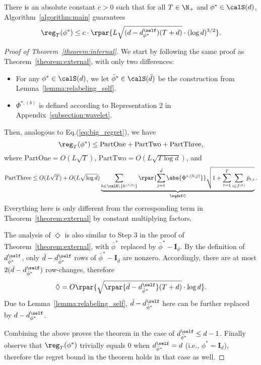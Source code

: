 \documentclass[10pt]{article}
\begin{document}
\begin{theorem}\label{theorem:internal}
There is an absolute constant $c>0$ such that for all $T\in\N_+$ and $\phi^*\in\calS(d)$, Algorithm~\ref{algorithm:main} guarantees
\begin{equation*}
\reg_T(\phi^*)\leq c\cdot\rpar{L\sqrt{(d-d^\self_{\phi^*})(T+d)}\cdot(\log d)^{3/2}}.
\end{equation*}
\end{theorem}

\begin{proof}[Proof of Theorem~\ref{theorem:internal}]
We start by following the same proof as Theorem~\ref{theorem:external}, with only two differences: 
\begin{itemize}
\item For any $\phi^*\in\calS(d)$, we let $\bar\phi^*\in\calS(\bar d)$ be the construction from Lemma~\ref{lemma:relabeling_self}.
\item $\Phi^{*,(b)}$ is defined according to Representation 2 in Appendix~\ref{subsection:wavelet}. 
\end{itemize}
Then, analogous to Eq.(\ref{eq:big_regret}), we have
\begin{equation*}
\reg_T(\phi^*)\leq \mathrm{PartOne}+\mathrm{PartTwo}+\mathrm{PartThree},
\end{equation*}
where $\mathrm{PartOne}=O(L\sqrt{T})$, $\mathrm{PartTwo}=O(L\sqrt{T\log d})$, and
\begin{align*}
\mathrm{PartThree}\leq O(L\sqrt{T})+O(L\sqrt{\log d})\underbrace{\sum_{h\in\calH\backslash\{h^{(S,0)}\}}\rpar{\sum_{j=1}^{\bar d}\abs{\Phi^{*,(h,j)}}}\sqrt{1+\sum_{t=1}^T\sum_{i\in I^{(h)}}\bar p_{t,i}}}_{\eqdef\Diamond}.
\end{align*}
Everything here is only different from the corresponding term in Theorem~\ref{theorem:external} by constant multiplying factors. 

The analysis of $\Diamond$ is also similar to Step 3 in the proof of Theorem~\ref{theorem:external}, with $\bar\phi^*$ replaced by $\bar\phi^*-\bm{I}_{\bar d}$. By the definition of $d^\self_{\bar\phi^*}$, only $\bar d-d^\self_{\bar\phi^*}$ rows of $\bar\phi^*-\bm{I}_{\bar d}$ are nonzero. Accordingly, there are at most $2(\bar d-d^\self_{\bar\phi^*})$ row-changes, therefore
\begin{equation*}
\Diamond=O\rpar{\sqrt{\rpar{\bar d-d^\self_{\bar\phi^*}}(T+d)}\cdot \log d}.
\end{equation*}
Due to Lemma~\ref{lemma:relabeling_self}, $\bar d-d^\self_{\bar\phi^*}$ here can be further replaced by $d-d^\self_{\phi^*}$. 

Combining the above proves the theorem in the case of $d^\self_{\bar\phi^*}\leq d-1$. Finally observe that $\reg_T(\phi^*)$ trivially equals $0$ when $d^\self_{\bar\phi^*}=d$ (i.e., $\phi^*=\bm{I}_d$), therefore the regret bound in the theorem holds in that case as well. 
\end{proof}
\end{document}
